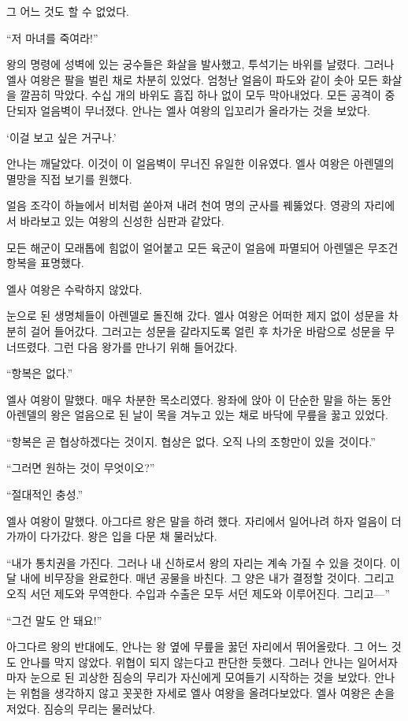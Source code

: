 그 어느 것도 할 수 없었다.

``저 마녀를 죽여라!''

왕의 명령에 성벽에 있는 궁수들은 화살을 발사했고, 투석기는 바위를 날렸다. 그러나 엘사 여왕은 팔을 벌린 채로 차분히 있었다. 엄청난 얼음이 파도와 같이 솟아 모든 화살을 깔끔히 막았다. 수십 개의 바위도 흠집 하나 없이 모두 막아내었다. 모든 공격이 중단되자 얼음벽이 무너졌다. 안나는 엘사 여왕의 입꼬리가 올라가는 것을 보았다.

`이걸 보고 싶은 거구나.'

안나는 깨달았다. 이것이 이 얼음벽이 무너진 유일한 이유였다. 엘사 여왕은 아렌델의 멸망을 직접 보기를 원했다.

얼음 조각이 하늘에서 비처럼 쏟아져 내려 천여 명의 군사를 꿰뚫었다. 영광의 자리에서 바라보고 있는 여왕의 신성한 심판과 같았다.

\textbreak

모든 해군이 모래톱에 힘없이 얼어붙고 모든 육군이 얼음에 파멸되어 아렌델은 무조건 항복을 표명했다.

엘사 여왕은 수락하지 않았다.

눈으로 된 생명체들이 아렌델로 돌진해 갔다. 엘사 여왕은 어떠한 제지 없이 성문을 차분히 걸어 들어갔다. 그러고는 성문을 갈라지도록 얼린 후 차가운 바람으로 성문을 무너뜨렸다. 그런 다음 왕가를 만나기 위해 들어갔다.

``항복은 없다.''

엘사 여왕이 말했다. 매우 차분한 목소리였다. 왕좌에 앉아 이 단순한 말을 하는 동안 아렌델의 왕은 얼음으로 된 날이 목을 겨누고 있는 채로 바닥에 무릎을 꿇고 있었다.

``항복은 곧 협상하겠다는 것이지. 협상은 없다. 오직 나의 조항만이 있을 것이다.''

``그러면 원하는 것이 무엇이오?''

``절대적인 충성.''

엘사 여왕이 말했다. 아그다르 왕은 말을 하려 했다. 자리에서 일어나려 하자 얼음이 더 가까이 다가갔다. 왕은 입을 다문 채 물러났다.

``내가 통치권을 가진다. 그러나 내 신하로서 왕의 자리는 계속 가질 수 있을 것이다. 이 달 내에 비무장을 완료한다. 매년 공물을 바친다. 그 양은 내가 결정할 것이다. 그리고 오직 서던 제도와 무역한다. 수입과 수출은 모두 서던 제도와 이루어진다. 그리고—''

``그건 말도 안 돼요!''

아그다르 왕의 반대에도, 안나는 왕 옆에 무릎을 꿇던 자리에서 뛰어올랐다. 그 어느 것도 안나를 막지 않았다. 위협이 되지 않는다고 판단한 듯했다. 그러나 안나는 일어서자마자 눈으로 된 괴상한 짐승의 무리가 자신에게 모여들기 시작하는 것을 보았다. 안나는 위험을 생각하지 않고 꼿꼿한 자세로 엘사 여왕을 올려다보았다. 엘사 여왕은 손을 저었다. 짐승의 무리는 물러났다.

